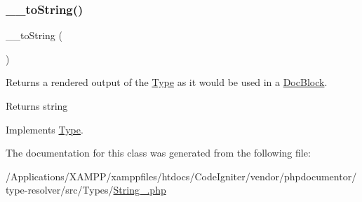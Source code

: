 \subsubsection{\texorpdfstring{\+\_\+\+\_\+to\+String()}{\_\_toString()}}
{\footnotesize\ttfamily \+\_\+\+\_\+to\+String (\begin{DoxyParamCaption}{ }\end{DoxyParamCaption})}

Returns a rendered output of the \mbox{\hyperlink{interfacephp_documentor_1_1_reflection_1_1_type}{Type}} as it would be used in a \mbox{\hyperlink{classphp_documentor_1_1_reflection_1_1_doc_block}{Doc\+Block}}.

\begin{DoxyReturn}{Returns}
string 
\end{DoxyReturn}


Implements \mbox{\hyperlink{interfacephp_documentor_1_1_reflection_1_1_type_a7516ca30af0db3cdbf9a7739b48ce91d}{Type}}.



The documentation for this class was generated from the following file\+:\begin{DoxyCompactItemize}
\item 
/\+Applications/\+X\+A\+M\+P\+P/xamppfiles/htdocs/\+Code\+Igniter/vendor/phpdocumentor/type-\/resolver/src/\+Types/\mbox{\hyperlink{_string___8php}{String\+\_\+.\+php}}\end{DoxyCompactItemize}
